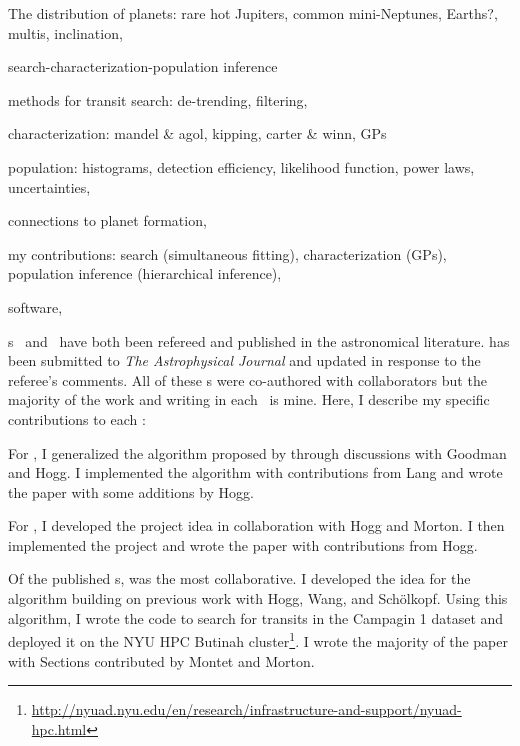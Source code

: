 {The distribution of planets: rare hot Jupiters, common mini-Neptunes,
Earths?, multis, inclination, \etc}

{search-characterization-population inference}

{methods for transit search: de-trending, filtering, \etc}

{characterization: mandel \& agol, kipping, carter \& winn, GPs}

{population: histograms, detection efficiency, likelihood function,
power laws, uncertainties, \etc}

{connections to planet formation, \etc}

{my contributions: search (simultaneous fitting), characterization
(GPs), population inference (hierarchical inference), \etc}

{software, \etc}

\chapname s~ and~ have both been refereed and
published in the astronomical literature.
 has been submitted to \emph{The Astrophysical Journal} and updated
in response to the referee's comments.
All of these \chapname s were co-authored with collaborators but the majority
of the work and writing in each \chapname\ is mine.
Here, I describe my specific contributions to each \chapname:
\begin{enumerate}

{\item For , I generalized the algorithm proposed by
\citet{Goodman:2010} through discussions with Goodman and Hogg.
I implemented the algorithm with contributions from Lang and wrote the paper
with some additions by Hogg.}

{\item For , I developed the project idea in collaboration with
Hogg and Morton.
I then implemented the project and wrote the paper with contributions from
Hogg.}

{\item Of the published \chapname s,  was the most collaborative.
I developed the idea for the algorithm building on previous work with Hogg,
Wang, and Sch\"olkopf.
Using this algorithm, I wrote the code to search for transits in the
 Campagin 1 dataset and deployed it on the NYU HPC Butinah
cluster\footnote{\url{http://nyuad.nyu.edu/en/research/infrastructure-and-support/nyuad-hpc.html}}.
I wrote the majority of the paper with Sections contributed by Montet and
Morton.}

\end{enumerate}
